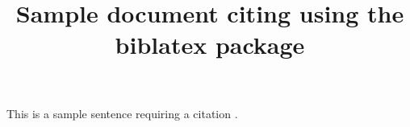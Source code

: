 \documentclass{article}
\title {Sample document citing using the biblatex package}
\begin{document}
\nocite{*}
\noindent This is a sample sentence requiring a citation \cite {Smith2021} . \ 
\end{document}
